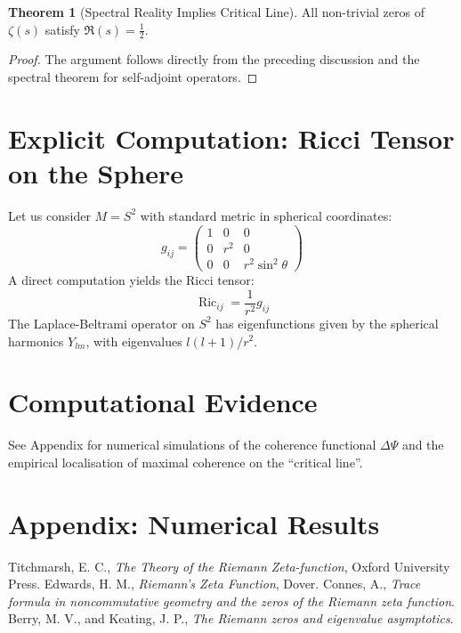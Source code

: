 \documentclass[12pt]{article}
\theoremstyle{definition}
\newtheorem{theorem}{Theorem}
\begin{document}
\begin{theorem}[Spectral Reality Implies Critical Line]
All non-trivial zeros of $\zeta(s)$ satisfy $\Re(s)=\frac{1}{2}$.
\end{theorem}

\begin{proof}
The argument follows directly from the preceding discussion and the spectral theorem for self-adjoint operators.
\end{proof}

\section{Explicit Computation: Ricci Tensor on the Sphere}

Let us consider $M = S^2$ with standard metric in spherical coordinates:
\[
g_{ij} = 
\begin{pmatrix}
1 & 0 & 0 \\
0 & r^2 & 0 \\
0 & 0 & r^2 \sin^2 \theta
\end{pmatrix}
\]
A direct computation yields the Ricci tensor:
\[
\operatorname{Ric}_{ij} = \frac{1}{r^2} g_{ij}
\]
The Laplace-Beltrami operator on $S^2$ has eigenfunctions given by the spherical harmonics $Y_{lm}$, with eigenvalues $l(l+1)/r^2$.

\section{Computational Evidence}

See Appendix for numerical simulations of the coherence functional $\Delta\Psi$ and the empirical localisation of maximal coherence on the “critical line”.

\section*{Appendix: Numerical Results}


\begin{thebibliography}{9}
 Titchmarsh, E. C., \emph{The Theory of the Riemann Zeta-function}, Oxford University Press.
 Edwards, H. M., \emph{Riemann's Zeta Function}, Dover.
 Connes, A., \emph{Trace formula in noncommutative geometry and the zeros of the Riemann zeta function}.
 Berry, M. V., and Keating, J. P., \emph{The Riemann zeros and eigenvalue asymptotics}.
\end{thebibliography}
\end{document}
